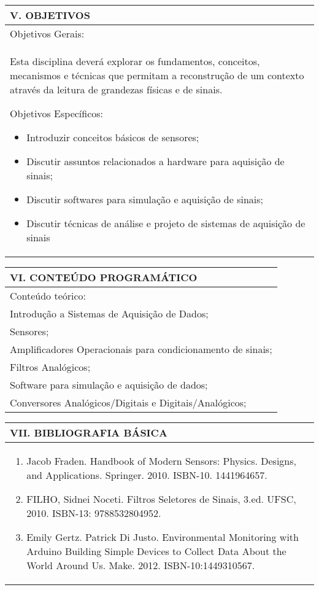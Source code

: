 \documentclass[12pt]{article}
\begin{document}
\begin{longtable}{|L{1.025\textwidth}|} \hline
%
{\bf V. OBJETIVOS } \\ \hline

Objetivos Gerais:\\
Esta disciplina deverá explorar os fundamentos, conceitos, mecanismos e técnicas que permitam a reconstrução de um contexto através da leitura de grandezas físicas e de sinais.

Objetivos Específicos: 
\begin{itemize}
\item Introduzir conceitos básicos de sensores;
\item Discutir assuntos relacionados a hardware para aquisição de sinais;
\item Discutir softwares para simulação e aquisição de sinais;
\item Discutir técnicas de análise e projeto de sistemas de aquisição de sinais
\end{itemize}
\\ \hline
\end{longtable}


\begin{longtable}{|L{1.025\textwidth}|} \hline
%
{\bf VI. CONTEÚDO PROGRAMÁTICO } \\ \hline
Conteúdo teórico: \\
Introdução a Sistemas de Aquisição de Dados;\\
Sensores;\\
Amplificadores Operacionais para condicionamento de sinais;\\
Filtros Analógicos;\\
Software para simulação e aquisição de dados;\\
Conversores Analógicos/Digitais e Digitais/Analógicos;
\\ \hline
\end{longtable} 



\begin{longtable}{|L{1.025\textwidth}|} \hline
%
{\bf VII. BIBLIOGRAFIA BÁSICA} \\ \hline
\begin{enumerate}
\item Jacob Fraden. Handbook of Modern Sensors: Physics. Designs, and Applications. Springer. 2010. ISBN-10. 1441964657. 
\item FILHO, Sidnei Noceti. Filtros Seletores de Sinais, 3.ed. UFSC, 2010. ISBN-13: 9788532804952.
\item  Emily Gertz. Patrick Di Justo. Environmental Monitoring with Arduino Building Simple Devices to Collect Data About the World Around Us. Make. 2012. ISBN-10:1449310567.
\end{enumerate}
 \\ \hline
\end{longtable}
\end{document}
